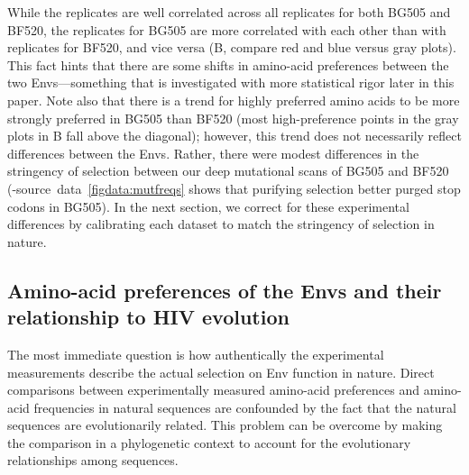 \documentclass[9pt]{elife}
\begin{document}
While the replicates are well correlated across all replicates for both BG505 and BF520, the replicates for BG505 are more correlated with each other than with replicates for BF520, and vice versa (B, compare red and blue versus gray plots).
This fact hints that there are some shifts in amino-acid preferences between the two Envs---something that is investigated with more statistical rigor later in this paper.
Note also that there is a trend for highly preferred amino acids to be more strongly preferred in BG505 than BF520 (most high-preference points in the gray plots in B fall above the diagonal); however, this trend does not necessarily reflect differences between the Envs.
Rather, there were modest differences in the stringency of selection between our deep mutational scans of BG505 and BF520 (-source~data~\ref{figdata:mutfreqs} shows that purifying selection better purged stop codons in BG505).
In the next section, we correct for these experimental differences by calibrating each dataset to match the stringency of selection in nature.

\subsection{Amino-acid preferences of the Envs and their relationship to HIV evolution}
The most immediate question is how authentically the experimental measurements describe the actual selection on Env function in nature.
Direct comparisons between experimentally measured amino-acid preferences and amino-acid frequencies in natural sequences are confounded by the fact that the natural sequences are evolutionarily related.
This problem can be overcome by making the comparison in a phylogenetic context to account for the evolutionary relationships among sequences.
\end{document}
